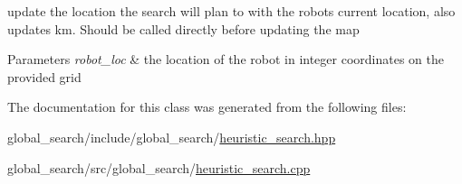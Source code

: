 update the location the search will plan to with the robot\textquotesingle{}s current location, also updates km. Should be called directly before updating the map 


\begin{DoxyParams}{Parameters}
{\em robot\+\_\+loc} & the location of the robot in integer coordinates on the provided grid \\
\hline
\end{DoxyParams}


The documentation for this class was generated from the following files\+:\begin{DoxyCompactItemize}
\item 
global\+\_\+search/include/global\+\_\+search/\hyperlink{heuristic__search_8hpp}{heuristic\+\_\+search.\+hpp}\item 
global\+\_\+search/src/global\+\_\+search/\hyperlink{heuristic__search_8cpp}{heuristic\+\_\+search.\+cpp}\end{DoxyCompactItemize}
